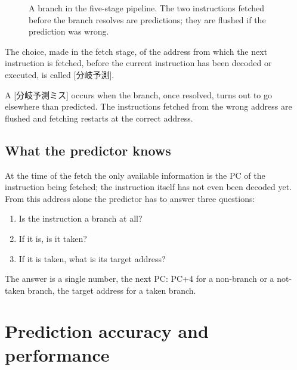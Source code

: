 \documentclass[../main.tex]{subfiles}
\begin{document}
\begin{figure}[htbp]
  \centering
  
  \caption{A branch in the five-stage pipeline.  The two instructions fetched
    before the branch resolves are predictions; they are flushed if the
    prediction was wrong.}
  \label{fig:l04-branch-pipeline}
\end{figure}

\begin{definition}
  \label{def:l04-branch-prediction}
  The choice, made in the fetch stage, of the address from which the next
  instruction is fetched, before the current instruction has been decoded
  or executed, is called [分岐予測].
\end{definition}

\begin{definition}[Misprediction]
  A [分岐予測ミス] occurs when the branch, once
  resolved, turns out to go elsewhere than predicted.  The instructions
  fetched from the wrong address are flushed and fetching restarts at the
  correct address.
\end{definition}

\subsection{What the predictor knows}

At the time of the fetch the only available information is the PC of the
instruction being fetched; the instruction itself has not even been decoded
yet.  From this address alone the predictor has to answer three questions:
\begin{enumerate}
  \item Is the instruction a branch at all?
  \item If it is, is it taken?
  \item If it is taken, what is its target address?
\end{enumerate}
The answer is a single number, the next PC: PC+4 for a non-branch or a
not-taken branch, the target address for a taken
branch.

\section{Prediction accuracy and performance}
\label{sec:l04-accuracy}
\end{document}
